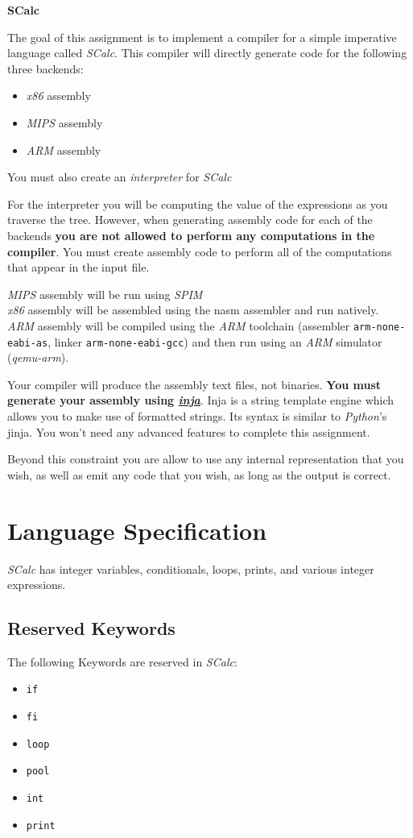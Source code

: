 \documentclass{article}
\newcommand{\code}[1]{\texttt{\textmd{#1}}}
\begin{document}
\ifpdf
  \LARGE
  \textbf{SCalc}
  \normalsize
\fi

The goal of this assignment is to implement a compiler for a simple imperative language called
\textit{SCalc}. This compiler will directly generate code for the following three backends:
\begin {itemize}
  \item \textit{x86} assembly
  \item \textit{MIPS} assembly
  \item \textit{ARM} assembly
\end {itemize}
You must also create an \textit{interpreter} for \textit{SCalc}

For the interpreter you will be computing the value of the expressions as you traverse the tree.
However, when generating assembly code for each of the backends \textbf{you are not allowed to
perform any computations in the compiler}. You must create assembly code to perform all of the
computations that appear in the input file.

\textit{MIPS} assembly will be run using \textit{SPIM}\\
\textit{x86} assembly will be assembled using the nasm assembler and run natively.\\
\textit{ARM} assembly will be compiled using the \textit{ARM} toolchain (assembler
\code{arm-none-eabi-as}, linker \code{arm-none-eabi-gcc}) and then run using an \textit{ARM}
simulator (\textit{qemu-arm}).

Your compiler will produce the assembly text files, not binaries. \textbf{You must generate your
assembly using \href{https://github.com/pantor/inja}{\textit{inja}}}. Inja is a string template
engine which allows you to make use of formatted strings. Its syntax is similar to
\textit{Python}'s jinja. You won't need any advanced features to complete this assignment.

Beyond this constraint you are allow to use any internal representation that you wish, as well as
emit any code that you wish, as long as the output is correct.

\section{Language Specification}
\textit{SCalc} has integer variables, conditionals, loops, prints, and various integer expressions.

\subsection{Reserved Keywords}
The following Keywords are reserved in \textit{SCalc}:
\begin {itemize}
  \item{\code{if}}
  \item{\code{fi}}
  \item{\code{loop}}
  \item{\code{pool}}
  \item{\code{int}}
  \item{\code{print}}
\end {itemize}
\end{document}
